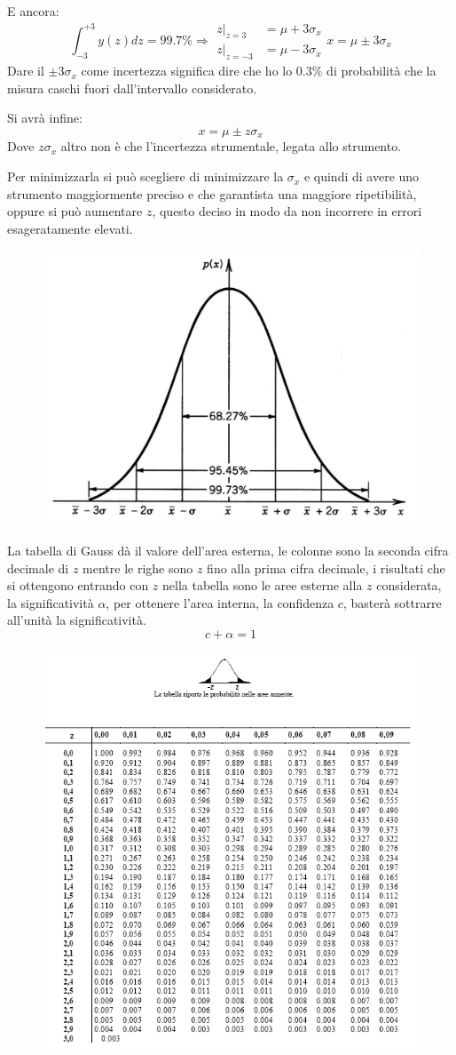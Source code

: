 \documentclass[a4paper, 15pt]{article}
\begin{document}
\begin{adjustwidth}{2in}{}
	E ancora:
	\[\int_{-3}^{+3}y(z)dz = 99.7\% \Rightarrow \begin{aligned}
		\left.z\right|_{z = 3} & = \mu + 3\sigma_x \\
		\left.z\right|_{z = -3} & = \mu - 3\sigma_x 
	\end{aligned} x = \mu \pm 3\sigma_x \]
	Dare il $ \pm 3\sigma_x$ come incertezza significa dire che ho lo $0.3\%$ di probabilità che la misura caschi fuori dall'intervallo considerato. \newline 
		
	Si avrà infine: 
	\[x = \mu \pm z\sigma_x\]
	Dove $z\sigma_x$ altro non è che l'incertezza strumentale, legata allo strumento. \newline 
	
	Per minimizzarla si può scegliere di minimizzare la $\sigma_x$ e quindi di avere uno strumento maggiormente preciso e che garantista una maggiore ripetibilità, oppure si può aumentare $z$, questo deciso in modo da non incorrere in errori esageratamente elevati. 
\begin{figure}[H]
	\centering
	\includegraphics[width=0.5\linewidth]{fig/screenshot003}
	\label{fig:screenshot003}
\end{figure}	
\newpage
	La tabella di Gauss dà il valore dell'area esterna, le colonne sono la seconda cifra decimale di $z$ mentre le righe sono $z$ fino alla prima cifra decimale, i risultati che si ottengono entrando con $z$ nella tabella sono le aree esterne alla $z$ considerata, la significatività $\alpha$, per ottenere l'area interna, la confidenza $c$, basterà sottrarre all'unità la significatività. 
	\[c + \alpha = 1\]	
	\begin{figure}[H]
		\centering
		\includegraphics[width=0.7\linewidth]{fig/screenshot007}

\end{figure}
\end{adjustwidth}
\end{document}
